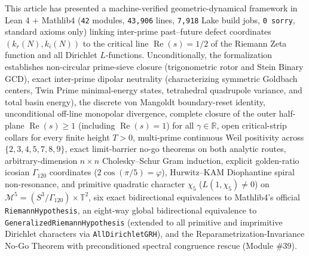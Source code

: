 \documentclass[
  11pt,
]{article}
\begin{document}
This article has presented a machine-verified geometric-dynamical
framework in Lean 4 + Mathlib4 (\texttt{42} modules, \texttt{43,906}
lines, \texttt{7,918} Lake build jobs, \texttt{0\ sorry}, standard
axioms only) linking inter-prime past--future defect coordinates
\((k_r(N), k_i(N))\) to the critical line \(\operatorname{Re}(s) = 1/2\)
of the Riemann Zeta function and all Dirichlet \(L\)-functions.
Unconditionally, the formalization establishes non-circular prime-sieve
closure (trigonometric rotor and Stein Binary GCD), exact inter-prime
dipolar neutrality (characterizing symmetric Goldbach centers, Twin
Prime minimal-energy states, tetrahedral quadrupole variance, and total
basin energy), the discrete von Mangoldt boundary-reset identity,
unconditional off-line monopolar divergence, complete closure of the
outer half-plane \(\operatorname{Re}(s) \ge 1\) (including
\(\operatorname{Re}(s) = 1\)) for all \(\gamma \in \mathbb{R}\), open
critical-strip collars for every finite height \(T > 0\), multi-prime
continuous Weil positivity across \(\{2,3,4,5,7,8,9\}\), exact
limit-barrier no-go theorems on both analytic routes,
arbitrary-dimension \(n \times n\) Cholesky--Schur Gram induction,
explicit golden-ratio icosian \(\Gamma_{120}\) coordinates
(\(2\cos(\pi/5)=\varphi\)), Hurwitz--KAM Diophantine spiral
non-resonance, and primitive quadratic character \(\chi_5\)
(\(L(1,\chi_5)\ne 0\)) on
\(\mathcal{M}^5 = (S^3/\Gamma_{120}) \times \mathbb{T}^2\), six exact
bidirectional equivalences to Mathlib4's official
\texttt{RiemannHypothesis}, an eight-way global bidirectional
equivalence to \texttt{GeneralizedRiemannHypothesis} (extended to all
primitive and imprimitive Dirichlet characters via
\texttt{AllDirichletGRH}), and the Reparametrization-Invariance No-Go
Theorem with preconditioned spectral congruence rescue (Module \#39).
\end{document}
